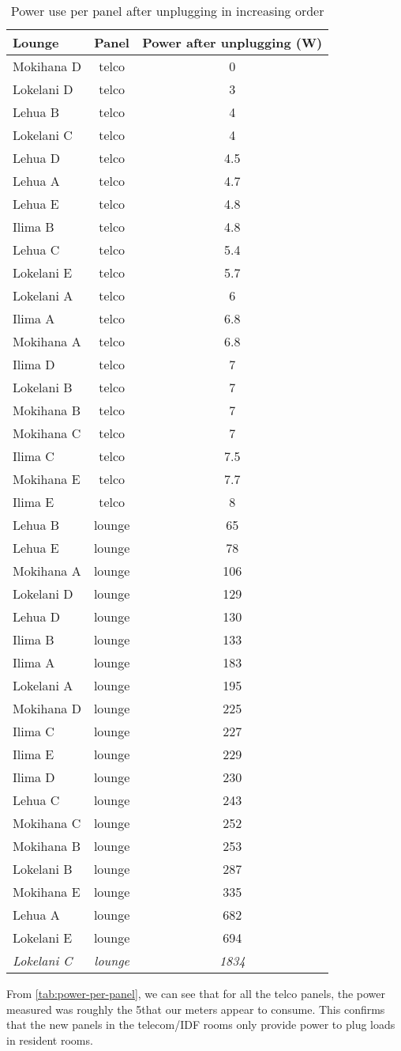 \begin{table}[htbp]
	\centering
	\scriptsize
		\begin{tabular}{| l | c | c |}
			\hline
			Lounge & Panel & Power after unplugging (W) \tabularnewline \hline \hline
			Mokihana D & telco & 0 \tabularnewline \hline
			Lokelani D & telco & 3 \tabularnewline \hline
			Lehua B & telco & 4 \tabularnewline \hline
			Lokelani C & telco & 4 \tabularnewline \hline
			Lehua D & telco & 4.5 \tabularnewline \hline
			Lehua A & telco & 4.7 \tabularnewline \hline
			Lehua E & telco & 4.8 \tabularnewline \hline
			Ilima B & telco & 4.8 \tabularnewline \hline
			Lehua C & telco & 5.4 \tabularnewline \hline
			Lokelani E & telco & 5.7 \tabularnewline \hline
			Lokelani A & telco & 6 \tabularnewline \hline
			Ilima A & telco & 6.8 \tabularnewline \hline
			Mokihana A & telco & 6.8 \tabularnewline \hline
			Ilima D & telco & 7 \tabularnewline \hline
			Lokelani B & telco & 7 \tabularnewline \hline
			Mokihana B & telco & 7 \tabularnewline \hline
			Mokihana C & telco & 7 \tabularnewline \hline
			Ilima C & telco & 7.5 \tabularnewline \hline
			Mokihana E & telco &7.7 \tabularnewline \hline
			Ilima E & telco & 8 \tabularnewline \hline \hline
			Lehua B & lounge & 65 \tabularnewline \hline
			Lehua E & lounge & 78 \tabularnewline \hline
			Mokihana A & lounge & 106 \tabularnewline \hline
			Lokelani D & lounge & 129 \tabularnewline \hline
			Lehua D & lounge & 130 \tabularnewline \hline
			Ilima B & lounge & 133 \tabularnewline \hline \hline
			Ilima A & lounge & 183 \tabularnewline \hline
			Lokelani A & lounge & 195 \tabularnewline \hline
			Mokihana D & lounge & 225 \tabularnewline \hline
			Ilima C & lounge & 227 \tabularnewline \hline
			Ilima E & lounge & 229 \tabularnewline \hline
			Ilima D & lounge & 230 \tabularnewline \hline
			Lehua C & lounge & 243 \tabularnewline \hline
			Mokihana C & lounge & 252 \tabularnewline \hline
			Mokihana B & lounge & 253 \tabularnewline \hline
			Lokelani B & lounge & 287 \tabularnewline \hline
			Mokihana E & lounge & 335 \tabularnewline \hline
			Lehua A & lounge & 682 \tabularnewline \hline
			Lokelani E & lounge & 694 \tabularnewline \hline \hline
			\emph{Lokelani C} & \emph{lounge} & \emph{1834} \tabularnewline \hline
		\end{tabular}
	\caption{Power use per panel after unplugging in increasing order}
\label{tab:power-per-panel}
\end{table}

From \autoref{tab:power-per-panel}, we can see that for all the telco panels, the power measured was roughly the 5\W that our meters appear to consume. This confirms that the new panels in the telecom/IDF rooms only provide power to plug loads in resident rooms.

